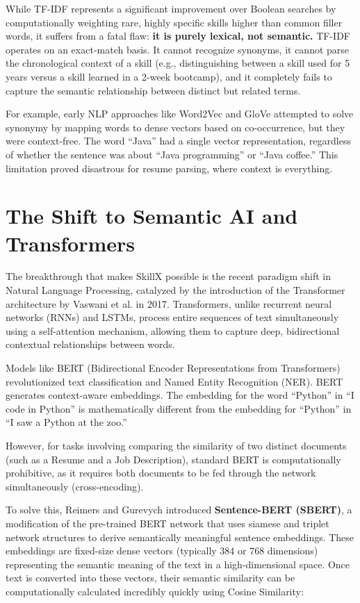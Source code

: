 \documentclass[12pt,a4paper]{report}
\begin{document}
While TF-IDF represents a significant improvement over Boolean searches by computationally weighting rare, highly specific skills higher than common filler words, it suffers from a fatal flaw: \textbf{it is purely lexical, not semantic.} TF-IDF operates on an exact-match basis. It cannot recognize synonyms, it cannot parse the chronological context of a skill (e.g., distinguishing between a skill used for 5 years versus a skill learned in a 2-week bootcamp), and it completely fails to capture the semantic relationship between distinct but related terms.

For example, early NLP approaches like Word2Vec and GloVe attempted to solve synonymy by mapping words to dense vectors based on co-occurrence, but they were context-free. The word ``Java'' had a single vector representation, regardless of whether the sentence was about ``Java programming'' or ``Java coffee.'' This limitation proved disastrous for resume parsing, where context is everything.

\section{The Shift to Semantic AI and Transformers}

The breakthrough that makes SkillX possible is the recent paradigm shift in Natural Language Processing, catalyzed by the introduction of the Transformer architecture by Vaswani et al. in 2017. Transformers, unlike recurrent neural networks (RNNs) and LSTMs, process entire sequences of text simultaneously using a self-attention mechanism, allowing them to capture deep, bidirectional contextual relationships between words.

Models like BERT (Bidirectional Encoder Representations from Transformers) revolutionized text classification and Named Entity Recognition (NER). BERT generates context-aware embeddings. The embedding for the word ``Python'' in ``I code in Python'' is mathematically different from the embedding for ``Python'' in ``I saw a Python at the zoo.''

However, for tasks involving comparing the similarity of two distinct documents (such as a Resume and a Job Description), standard BERT is computationally prohibitive, as it requires both documents to be fed through the network simultaneously (cross-encoding).

To solve this, Reimers and Gurevych introduced \textbf{Sentence-BERT (SBERT)}, a modification of the pre-trained BERT network that uses siamese and triplet network structures to derive semantically meaningful sentence embeddings. These embeddings are fixed-size dense vectors (typically 384 or 768 dimensions) representing the semantic meaning of the text in a high-dimensional space. Once text is converted into these vectors, their semantic similarity can be computationally calculated incredibly quickly using Cosine Similarity:
\end{document}
